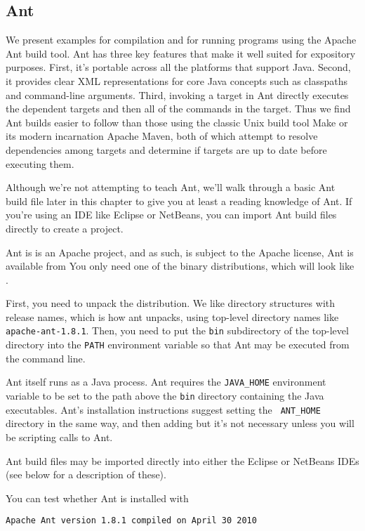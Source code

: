 \subsection{Ant}

We present examples for compilation and for running programs
using the Apache Ant build tool.  Ant has three key features that make
it well suited for expository purposes.  First, it's portable across
all the platforms that support Java.  Second, it provides clear XML
representations for core Java concepts such as classpaths and
command-line arguments.  Third, invoking a target in Ant directly
executes the dependent targets and then all of the commands in the
target.  Thus we find Ant builds easier to follow than those using the
classic Unix build tool Make or its modern incarnation Apache Maven, both
of which attempt to resolve dependencies among targets and determine
if targets are up to date before executing them.

Although we're not attempting to teach Ant, we'll walk through a basic
Ant build file later in this chapter to give you at least a reading
knowledge of Ant.  If you're using an IDE like Eclipse or NetBeans,
you can import Ant build files directly to create a project.

Ant is is an Apache project, and as such, is subject to the Apache license,
%
%
Ant is available from 
%
%
You only need one of the binary distributions, which will
look like .

First, you need to unpack the distribution.  We like directory
structures with release names, which is how ant unpacks, using
top-level directory names like {\tt apache-ant-1.8.1}.  Then, you need
to put the {\tt bin} subdirectory of the top-level directory into the
{\tt PATH} environment variable so that Ant may be executed from the
command line.

Ant itself runs as a Java process.
Ant requires the {\tt JAVA\_HOME} environment variable to be set to
the path above the {\tt bin} directory containing the Java
executables.  Ant's installation instructions suggest setting the {\tt
ANT\_HOME} directory in the same way, and then adding but it's not
necessary unless you will be scripting calls to Ant.

Ant build files may be imported directly into either the Eclipse or
NetBeans IDEs (see below for a description of these).

You can test whether Ant is installed with
%
\begin{verbatim}
Apache Ant version 1.8.1 compiled on April 30 2010
\end{verbatim}

